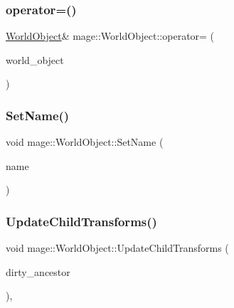 \hypertarget{classmage_1_1_world_object_a8dbb67991f149a2d4edbcd17ae4ec3ef}{}\label{classmage_1_1_world_object_a8dbb67991f149a2d4edbcd17ae4ec3ef} 
\subsubsection{\texorpdfstring{operator=()}{operator=()}\hspace{0.1cm}{\footnotesize\ttfamily [2/2]}}
{\footnotesize\ttfamily \hyperlink{classmage_1_1_world_object}{World\+Object}\& mage\+::\+World\+Object\+::operator= (\begin{DoxyParamCaption}\item[{\hyperlink{classmage_1_1_world_object}{World\+Object} \&\&}]{world\+\_\+object }\end{DoxyParamCaption})\hspace{0.3cm}{\ttfamily [default]}}

\hypertarget{classmage_1_1_world_object_aee42f65080a69ed5cfc681382328fe31}{}\label{classmage_1_1_world_object_aee42f65080a69ed5cfc681382328fe31} 
\subsubsection{\texorpdfstring{Set\+Name()}{SetName()}}
{\footnotesize\ttfamily void mage\+::\+World\+Object\+::\+Set\+Name (\begin{DoxyParamCaption}\item[{const string \&}]{name }\end{DoxyParamCaption})}

\hypertarget{classmage_1_1_world_object_ab384751f7c14c931e8606f927825b6c8}{}\label{classmage_1_1_world_object_ab384751f7c14c931e8606f927825b6c8} 
\subsubsection{\texorpdfstring{Update\+Child\+Transforms()}{UpdateChildTransforms()}}
{\footnotesize\ttfamily void mage\+::\+World\+Object\+::\+Update\+Child\+Transforms (\begin{DoxyParamCaption}\item[{bool}]{dirty\+\_\+ancestor }\end{DoxyParamCaption})\hspace{0.3cm}{\ttfamily [private]}, {\ttfamily [virtual]}}



